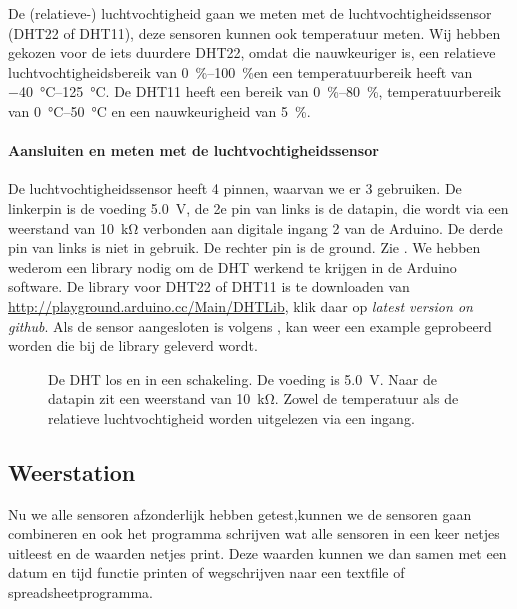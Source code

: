 De (relatieve-) luchtvochtigheid gaan we meten met de
luchtvochtigheidssensor (DHT22 of DHT11), deze sensoren kunnen ook
temperatuur meten. Wij hebben gekozen voor de iets duurdere DHT22, omdat
die nauwkeuriger is, een relatieve luchtvochtigheidsbereik van
\SIrange{0}{100}{\percent}en een temperatuurbereik heeft van
\SIrange{-40}{125}{\degreeCelsius}. De DHT11 heeft een bereik
van \SIrange{0}{80}{\percent}, temperatuurbereik van \SIrange{0}{50}{\degreeCelsius}
en een nauwkeurigheid van \SI{5}{\percent}.

\paragraph{Aansluiten en meten met de luchtvochtigheidssensor}

De luchtvochtigheidssensor heeft 4 pinnen, waarvan we er 3 gebruiken. De
linkerpin is de voeding \SI{5.0}{\volt}, de 2e pin van links is de
datapin, die wordt via een weerstand van \SI{10}{\kilo\ohm} verbonden
aan digitale ingang 2 van de Arduino. De derde pin van links is niet in
gebruik. De rechter pin is de ground. Zie . We hebben
wederom een library nodig om de DHT werkend te krijgen in de Arduino
software. De library voor DHT22 of DHT11 is te downloaden van
\url{http://playground.arduino.cc/Main/DHTLib}, klik daar op
\emph{latest version on github}. Als de sensor aangesloten is volgens
, kan weer een example geprobeerd
worden die bij de library geleverd wordt.

\begin{figure}
    \centering
    \hfill
    \caption{De DHT los en in een schakeling. De voeding is \SI{5.0}{\volt}.
    Naar de datapin zit een weerstand van \SI{10}{\kilo\ohm}. Zowel de
    temperatuur als de relatieve luchtvochtigheid worden uitgelezen via
    een ingang.}
\end{figure}

\subsection{Weerstation}

Nu we alle sensoren afzonderlijk hebben getest,kunnen we de sensoren
gaan combineren en ook het programma schrijven wat alle sensoren in een
keer netjes uitleest en de waarden netjes print. Deze waarden kunnen we
dan samen met een datum en tijd functie printen of wegschrijven naar een
textfile of spreadsheetprogramma.

